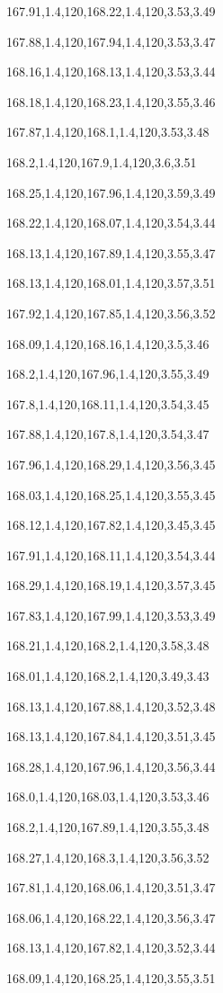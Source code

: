 167.91,1.4,120,168.22,1.4,120,3.53,3.49

167.88,1.4,120,167.94,1.4,120,3.53,3.47

168.16,1.4,120,168.13,1.4,120,3.53,3.44

168.18,1.4,120,168.23,1.4,120,3.55,3.46

167.87,1.4,120,168.1,1.4,120,3.53,3.48

168.2,1.4,120,167.9,1.4,120,3.6,3.51

168.25,1.4,120,167.96,1.4,120,3.59,3.49

168.22,1.4,120,168.07,1.4,120,3.54,3.44

168.13,1.4,120,167.89,1.4,120,3.55,3.47

168.13,1.4,120,168.01,1.4,120,3.57,3.51

167.92,1.4,120,167.85,1.4,120,3.56,3.52

168.09,1.4,120,168.16,1.4,120,3.5,3.46

168.2,1.4,120,167.96,1.4,120,3.55,3.49

167.8,1.4,120,168.11,1.4,120,3.54,3.45

167.88,1.4,120,167.8,1.4,120,3.54,3.47

167.96,1.4,120,168.29,1.4,120,3.56,3.45

168.03,1.4,120,168.25,1.4,120,3.55,3.45

168.12,1.4,120,167.82,1.4,120,3.45,3.45

167.91,1.4,120,168.11,1.4,120,3.54,3.44

168.29,1.4,120,168.19,1.4,120,3.57,3.45

167.83,1.4,120,167.99,1.4,120,3.53,3.49

168.21,1.4,120,168.2,1.4,120,3.58,3.48

168.01,1.4,120,168.2,1.4,120,3.49,3.43

168.13,1.4,120,167.88,1.4,120,3.52,3.48

168.13,1.4,120,167.84,1.4,120,3.51,3.45

168.28,1.4,120,167.96,1.4,120,3.56,3.44

168.0,1.4,120,168.03,1.4,120,3.53,3.46

168.2,1.4,120,167.89,1.4,120,3.55,3.48

168.27,1.4,120,168.3,1.4,120,3.56,3.52

167.81,1.4,120,168.06,1.4,120,3.51,3.47

168.06,1.4,120,168.22,1.4,120,3.56,3.47

168.13,1.4,120,167.82,1.4,120,3.52,3.44

168.09,1.4,120,168.25,1.4,120,3.55,3.51

